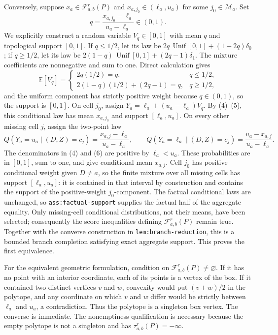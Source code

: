 Conversely, suppose \(x_a\in\mathcal F_{a,b}^r(P)\) and \(x_{a,j_0}\in(\ell_a,u_a)\) for some \(j_0\in\mathcal M_a\).  Set
\[
q=\frac{x_{a,j_0}-\ell_a}{u_a-\ell_a}\in(0,1).
\tag{4}
\]
We explicitly construct a random variable \(V_q\in[0,1]\) with mean \(q\) and topological support \([0,1]\).  If \(q\le 1/2\), let its law be
\(2q\,\operatorname{Unif}[0,1]+(1-2q)\delta_0\); if \(q\ge 1/2\), let its law be
\(2(1-q)\,\operatorname{Unif}[0,1]+(2q-1)\delta_1\).  The mixture coefficients are nonnegative and sum to one.  Direct calculation gives
\[
\mathbb E[V_q]
=
\begin{cases}
2q(1/2)=q,&q\le 1/2,\\
2(1-q)(1/2)+(2q-1)=q,&q\ge 1/2,
\end{cases}
\tag{5}
\]
and the uniform component has strictly positive weight because \(q\in(0,1)\), so the support is \([0,1]\).  On cell \(j_0\), assign
\(Y_a=\ell_a+(u_a-\ell_a)V_q\).  By (4)--(5), this conditional law has mean \(x_{a,j_0}\) and support \([\ell_a,u_a]\).  On every other missing cell \(j\), assign the two-point law
\[
Q(Y_a=u_a\mid(D,Z)=c_j)
=\frac{x_{a,j}-\ell_a}{u_a-\ell_a},
\qquad
Q(Y_a=\ell_a\mid(D,Z)=c_j)
=\frac{u_a-x_{a,j}}{u_a-\ell_a}.
\tag{6}
\]
The denominators in (4) and (6) are positive by \(\ell_a<u_a\).  These probabilities are in \([0,1]\), sum to one, and give conditional mean \(x_{a,j}\).  Cell \(j_0\) has positive conditional weight given \(D\ne a\), so the finite mixture over all missing cells has support \([\ell_a,u_a]\): it is contained in that interval by construction and contains the support of the positive-weight \(j_0\)-component.  The factual conditional laws are unchanged, so \texttt{ass:factual-support} supplies the factual half of the aggregate equality.  Only missing-cell conditional distributions, not their means, have been selected; consequently the score inequalities defining \(\mathcal F_{a,b}^r(P)\) remain true.  Together with the converse construction in \texttt{lem:branch-reduction}, this is a bounded branch completion satisfying exact aggregate support.  This proves the first equivalence.

For the equivalent geometric formulation, condition on \(\mathcal F_{a,b}^r(P)\ne\varnothing\).  If it has no point with an interior coordinate, each of its points is a vertex of the box.  If it contained two distinct vertices \(v\) and \(w\), convexity would put \((v+w)/2\) in the polytope, and any coordinate on which \(v\) and \(w\) differ would be strictly between \(\ell_a\) and \(u_a\), a contradiction.  Thus the polytope is a singleton box vertex.  The converse is immediate.  The nonemptiness qualification is necessary because the empty polytope is not a singleton and has \(\tau_{a,b}^r(P)=-\infty\).

